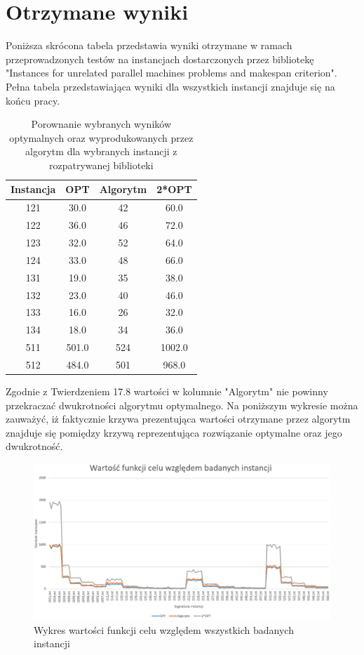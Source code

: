 \documentclass[12pt, a4paper]{report}
\begin{document}
\chapter{Otrzymane wyniki}
  Poniższa skrócona tabela przedstawia wyniki otrzymane w ramach przeprowadzonych testów na instancjach dostarczonych 
  przez bibliotekę "Instances for unrelated parallel machines problems and makespan criterion". Pełna tabela 
  przedstawiająca wyniki dla wszystkich instancji znajduje się na końcu pracy.
  \begin{table}[H]
    \centering
    \begin{tabular}{|c | c | c | c |} 
    \hline
    Instancja & OPT & Algorytm & 2*OPT\\
    \hline
    121 & 30.0 & 42 & 60.0 \\
    122 & 36.0 & 46 & 72.0 \\
    123 & 32.0 & 52 & 64.0 \\
    124 & 33.0 & 48 & 66.0 \\
    131 & 19.0 & 35 & 38.0 \\
    132 & 23.0 & 40 & 46.0 \\
    133 & 16.0 & 26 & 32.0 \\
    134 & 18.0 & 34 & 36.0 \\
    511 & 501.0 & 524 & 1002.0 \\
    512 & 484.0 & 501 & 968.0 \\
    \hline
    \end{tabular}
    \caption{Porownanie wybranych wyników optymalnych oraz wyprodukowanych przez algorytm dla wybranych instancji z rozpatrywanej biblioteki}
\end{table}
  Zgodnie z Twierdzeniem 17.8 \cite{Alg} wartości w kolumnie "Algorytm" nie powinny przekraczać dwukrotności algorytmu optymalnego. Na poniższym wykresie
  można zauważyć, iż faktycznie krzywa prezentująca wartości otrzymane przez algorytm znajduje się pomiędzy krzywą reprezentująca rozwiązanie optymalne oraz jego dwukrotność.
  \begin{figure}[H]
    \includegraphics[scale=0.5]{1}
    \centering
    \caption{Wykres wartości funkcji celu względem wszystkich badanych instancji}
  \end{figure}
\end{document}
